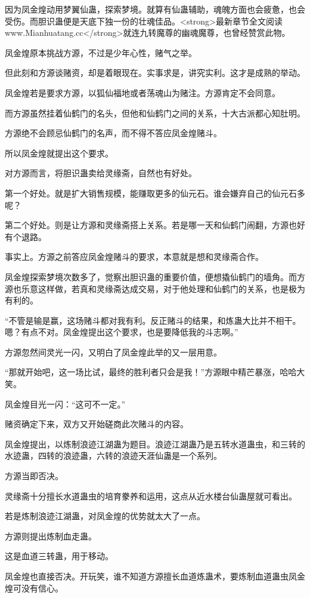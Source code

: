 \begin{this_body}
因为凤金煌动用梦翼仙蛊，探索梦境。就算有仙蛊辅助，魂魄方面也会疲惫，也会受伤。而胆识蛊便是天底下独一份的壮魂佳品。<strong>最新章节全文阅读www.Mianhuatang.cc</strong>就连九转魔尊的幽魂魔尊，也曾经赞赏此物。

凤金煌原本挑战方源，不过是少年心性，赌气之举。

但此刻和方源谈赌资，却是着眼现在。实事求是，讲究实利。这才是成熟的举动。

凤金煌若是要求方源，以狐仙福地或者荡魂山为赌注。方源肯定不会同意。

而方源虽然挂着仙鹤门的名头，但他和仙鹤门之间的关系，十大古派都心知肚明。

方源绝不会顾忌仙鹤门的名声，而不得不答应凤金煌赌斗。

所以凤金煌就提出这个要求。

对方源而言，将胆识蛊卖给灵缘斋，自然也有好处。

第一个好处。就是扩大销售规模，能赚取更多的仙元石。谁会嫌弃自己的仙元石多呢？

第二个好处。则是让方源和灵缘斋搭上关系。若是哪一天和仙鹤门闹翻，方源也好有个退路。

事实上。方源之前答应凤金煌赌斗的要求，本意就是想和灵缘斋合作。

凤金煌探索梦境次数多了，觉察出胆识蛊的重要价值，便想撬仙鹤门的墙角。而方源也乐意这样做，若真和灵缘斋达成交易，对于他处理和仙鹤门的关系，也是极为有利的。

“不管是输是赢，这场赌斗都对我有利。反正赌斗的结果，和炼蛊大比并不相干。嗯？有点不对。凤金煌提出这个要求，也是要降低我的斗志啊。”

方源忽然间灵光一闪，又明白了凤金煌此举的又一层用意。

“那就开始吧，这一场比试，最终的胜利者只会是我！”方源眼中精芒暴涨，哈哈大笑。

凤金煌目光一闪：“这可不一定。”

赌资确定下来，双方又开始磋商此次赌斗的内容。

凤金煌提出，以炼制浪迹江湖蛊为题目。浪迹江湖蛊乃是五转水道蛊虫，和三转的水迹蛊，四转的浪迹蛊，六转的浪迹天涯仙蛊是一个系列。

方源当即否决。

灵缘斋十分擅长水道蛊虫的培育豢养和运用，这点从近水楼台仙蛊屋就可看出。

若是炼制浪迹江湖蛊，对凤金煌的优势就太大了一点。

方源则提出炼制血走蛊。

这是血道三转蛊，用于移动。

凤金煌也直接否决。开玩笑，谁不知道方源擅长血道炼蛊术，要炼制血道蛊虫凤金煌可没有信心。


\end{this_body}
